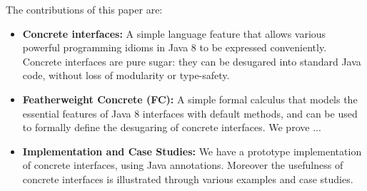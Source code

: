 The contributions of this paper are:

\begin{itemize}

\item {\bf Concrete interfaces:} A simple language feature that allows 
various powerful programming idioms in Java 8 to be expressed conveniently. 
Concrete interfaces are pure sugar: they can be desugared into standard Java 
code, without loss of modularity or type-safety. 

\item {\bf Featherweight Concrete (FC):} A simple formal calculus that models 
the essential features of Java 8 interfaces with default methods, and 
can be used to formally define the desugaring of concrete interfaces. 
We prove ...

\item {\bf Implementation and Case Studies:} We have a prototype implementation 
  of concrete interfaces, using Java annotations. Moreover the usefulness
  of concrete interfaces is illustrated through various examples and
  case studies.

\end{itemize}

